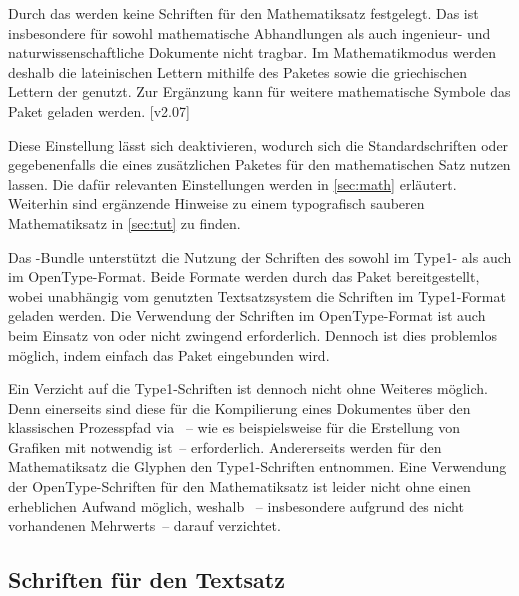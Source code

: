 \begin{DeclareEntity*}{}
\begin{DeclareEntity*}{}
\begin{DeclareEntity*}{}
%
Durch das \CD werden keine Schriften für den Mathematiksatz festgelegt. Das ist 
insbesondere für sowohl mathematische Abhandlungen als auch ingenieur- und 
naturwissenschaftliche Dokumente nicht tragbar. Im Mathematikmodus werden 
deshalb die lateinischen Lettern mithilfe des Paketes 
sowie die griechischen Lettern der \OpenSans genutzt. Zur Ergänzung kann für 
weitere mathematische Symbole das Paket  geladen werden.
[v2.07]

Diese Einstellung lässt sich deaktivieren, wodurch sich die Standardschriften 
oder gegebenenfalls die eines zusätzlichen Paketes für den mathematischen Satz 
nutzen lassen. Die dafür relevanten Einstellungen werden in \autoref{sec:math} 
erläutert. Weiterhin sind ergänzende Hinweise zu einem typografisch sauberen
Mathematiksatz in \autoref{sec:tut} zu finden.



%
Das \TUDScript-Bundle unterstützt die Nutzung der Schriften des \CDs sowohl 
im Type1- als auch im OpenType-Format. Beide Formate werden durch das Paket 
 bereitgestellt, wobei unabhängig vom genutzten 
Textsatzsystem die Schriften im Type1-Format geladen werden. Die Verwendung 
der Schriften im OpenType-Format ist auch beim Einsatz von  
oder  nicht zwingend erforderlich. Dennoch ist dies problemlos 
möglich, indem einfach das Paket  eingebunden wird.

Ein Verzicht auf die Type1-Schriften ist dennoch nicht ohne Weiteres möglich. 
Denn einerseits sind diese für die Kompilierung eines Dokumentes über den 
klassischen Prozesspfad via ~-- wie es 
beispielsweise für die Erstellung von Grafiken mit  notwendig 
ist~-- erforderlich. Andererseits werden für den Mathematiksatz die Glyphen den 
Type1-Schriften entnommen. Eine Verwendung der OpenType-Schriften für den 
Mathematiksatz ist leider nicht ohne einen erheblichen Aufwand möglich, weshalb 
\TUDScript~-- insbesondere aufgrund des nicht vorhandenen Mehrwerts~-- darauf 
verzichtet.



\subsection{%
  Schriften für den Textsatz%
  \label{sec:text}%
}


\end{DeclareEntity*}
\end{DeclareEntity*}
\end{DeclareEntity*}

